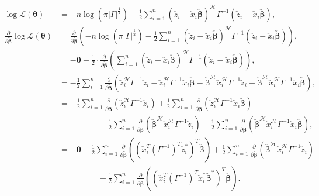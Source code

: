 \documentclass[honours,12pt]{unswthesis}
\newcommand{\ta}{\bm{\theta}}
\newcommand{\augb}{\bm{\utilde{\beta}}}
\newcommand{\ct}{\mathcal{H}}
\numberwithin{equation}{section}
\begin{document}
\begin{align*}
	\log{\mathcal{L}(\ta)} &= - n \log{ \left( \pi |\Gamma|^{\frac{1}{2}} \right) } - \frac{1}{2} \sum_{i=1}^{n} \left( \utilde{z}_{i} - \utilde{x}_{i} \augb \right)^{\ct} \Gamma^{-1} \left( \utilde{z}_{i} - \utilde{x}_{i} \augb \right),\\
	\frac{\partial}{\partial \augb} \log{\mathcal{L}(\ta)} &=  \frac{\partial}{\partial \augb} \left( - n \log{ \left( \pi |\Gamma|^{\frac{1}{2}} \right) } - \frac{1}{2} \sum_{i=1}^{n} \left( \utilde{z}_{i} - \utilde{x}_{i} \augb \right)^{\ct} \Gamma^{-1} \left( \utilde{z}_{i} - \utilde{x}_{i} \augb \right) \right),\\
	&= - \mathbf{0} - \frac{1}{2} \cdot \frac{\partial}{\partial \augb} \left( \sum_{i=1}^{n} \left( \utilde{z}_{i} - \utilde{x}_{i} \augb \right)^{\ct} \Gamma^{-1} \left( \utilde{z}_{i} - \utilde{x}_{i} \augb \right) \right),\\
	&= - \frac{1}{2}\sum_{i=1}^{n} \frac{\partial}{\partial \augb} \left( \utilde{z}_{i}^{\ct} \Gamma^{-1} \utilde{z}_{i} - \utilde{z}_{i}^{\ct} \Gamma^{-1} \utilde{x}_{i} \augb - \augb^{\ct} \utilde{x}_{i}^{\ct} \Gamma^{-1} \utilde{z}_{i} + \augb^{\ct} \utilde{x}_{i}^{\ct} \Gamma^{-1} \utilde{x}_{i} \augb \right),\\
	&= - \frac{1}{2} \sum_{i=1}^{n} \frac{\partial}{\partial \augb} \left( \utilde{z}_{i}^{\ct} \Gamma^{-1} \utilde{z}_{i} \right)  + \frac{1}{2} \sum_{i=1}^{n} \frac{\partial}{\partial \augb} \left(\utilde{z}_{i}^{\ct} \Gamma^{-1} \utilde{x}_{i} \augb \right)  \\
	&\hspace{2cm} + \frac{1}{2} \sum_{i=1}^{n} \frac{\partial}{\partial \augb} \left(  \augb^{\ct} \utilde{x}_{i}^{\ct}\Gamma^{-1} \utilde{z}_{i} \right) - \frac{1}{2} \sum_{i=1}^{n} \frac{\partial}{\partial \augb} \left( \augb^{\ct} \utilde{x}_{i}^{\ct} \Gamma^{-1} \utilde{x}_{i} \augb \right),\\
	&= - \mathbf{0} + \frac{1}{2} \sum_{i=1}^{n} \frac{\partial}{\partial \augb} \left( \left( \utilde{x}_{i}^{T} \left( \Gamma^{-1} \right)^{T} \utilde{z}_{i}^{*} \right)^{T} \augb \right)  + \frac{1}{2} \sum_{i=1}^{n} \frac{\partial}{\partial \augb} \left(  \augb^{\ct} \utilde{x}_{i}^{\ct}\Gamma^{-1} \utilde{z}_{i} \right) \\
	&\hspace{2cm}- \frac{1}{2} \sum_{i=1}^{n} \frac{\partial}{\partial \augb} \left( \left( \utilde{x}_{i}^{T} \left( \Gamma^{-1} \right)^{T} \utilde{x}_{i}^{*} \augb^{*} \right)^{T} \augb \right).
\end{align*}
\end{document}

